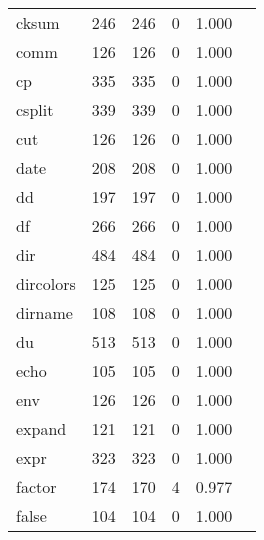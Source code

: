 \begin{longtable}{lp{2.40cm}p{2.40cm}p{2.40cm}p{2.40cm}p{2.40cm}}
cksum     &                     246 &              246 &                 0 &                        1.000 \\
comm      &                     126 &              126 &                 0 &                        1.000 \\
cp        &                     335 &              335 &                 0 &                        1.000 \\
csplit    &                     339 &              339 &                 0 &                        1.000 \\
cut       &                     126 &              126 &                 0 &                        1.000 \\
date      &                     208 &              208 &                 0 &                        1.000 \\
dd        &                     197 &              197 &                 0 &                        1.000 \\
df        &                     266 &              266 &                 0 &                        1.000 \\
dir       &                     484 &              484 &                 0 &                        1.000 \\
dircolors &                     125 &              125 &                 0 &                        1.000 \\
dirname   &                     108 &              108 &                 0 &                        1.000 \\
du        &                     513 &              513 &                 0 &                        1.000 \\
echo      &                     105 &              105 &                 0 &                        1.000 \\
env       &                     126 &              126 &                 0 &                        1.000 \\
expand    &                     121 &              121 &                 0 &                        1.000 \\
expr      &                     323 &              323 &                 0 &                        1.000 \\
factor    &                     174 &              170 &                 4 &                        0.977 \\
false     &                     104 &              104 &                 0 &                        1.000 \\

\end{longtable}
